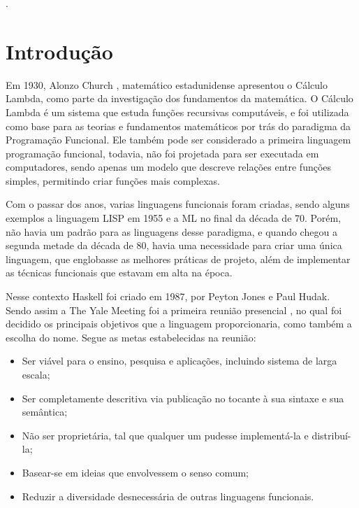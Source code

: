 \documentclass[
  12pt,				         %
  oneside,			       %
  a4paper,			       %
  english,		       	 %
  brazil,			      	 %
]{abntex2}
\begin{document}
 

    \renewcommand{\thesection}{\noindent\arabic{chapter}.\arabic{section}}. 
    \frenchspacing
    \imprimircapa
    \tableofcontents*
    \cleardoublepage
    \textual
    \newpage
    \chapter*[Introdução]{Introdução}

    Em 1930, Alonzo Church , matemático estadunidense apresentou o Cálculo Lambda, como parte da investigação dos fundamentos da matemática. O Cálculo Lambda é um sistema que
    estuda funções recursivas computáveis, e foi utilizada como base para as teorias e fundamentos matemáticos por trás do paradigma da Programação Funcional. Ele também
    pode ser considerado a primeira linguagem programação funcional, todavia, não foi projetada para ser executada em computadores, sendo apenas um modelo que descreve relações entre funções
    simples, permitindo criar funções mais complexas.

    Com o passar dos anos, varias linguagens funcionais foram criadas, sendo alguns exemplos a linguagem LISP em 1955 e a ML no final da década de 70. Porém, não
    havia um padrão para as linguagens desse paradigma, e quando chegou a segunda metade da década de 80, havia uma necessidade para criar uma única linguagem, que englobasse
    as melhores práticas de projeto, além de implementar as técnicas funcionais que estavam em alta na época.

    Nesse contexto Haskell foi criado em 1987, por Peyton Jones e Paul Hudak. Sendo assim a The Yale Meeting foi a primeira reunião presencial , no qual foi decidido
    os principais objetivos que a linguagem proporcionaria, como também a escolha do nome. 
    Segue as metas estabelecidas na reunião:

    \begin{itemize}
      \item Ser viável para o ensino, pesquisa e aplicações, incluindo sistema de larga escala;
      \item Ser completamente descritiva via publicação no tocante à sua sintaxe e sua semântica;
      \item Não ser proprietária, tal que qualquer um pudesse implementá-la e distribuí-la;
      \item Basear-se em ideias que envolvessem o senso comum;
      \item Reduzir a diversidade desnecessária de outras linguagens funcionais.
    \end{itemize} 
\end{document}
